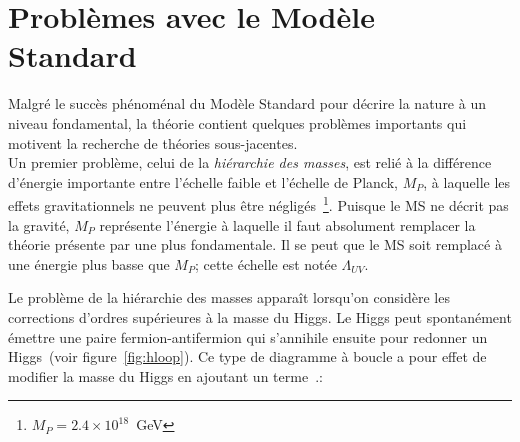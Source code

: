 



\section{Problèmes avec le Modèle Standard}
\label{sec:ms:problemes}

Malgré le succès phénoménal du Modèle Standard pour décrire la nature
à un niveau fondamental, la théorie contient quelques problèmes
importants qui motivent la recherche de théories sous-jacentes. \\

Un premier problème, celui de la \emph{hiérarchie des masses}, est
relié à la différence d'énergie importante entre l'échelle faible et
l'échelle de Planck, $M_P$, à laquelle les effets gravitationnels ne
peuvent plus être négligés~\footnote{$M_P = 2.4 \times 10^{18}$~GeV}. Puisque le MS ne décrit pas la gravité,
$M_P$ représente l'énergie à laquelle il faut absolument remplacer la
théorie présente par une plus fondamentale. Il se peut que le MS soit
remplacé à une énergie plus basse que $M_P$; cette échelle est notée $\Lambda_{UV}$.

Le problème de la hiérarchie des masses apparaît lorsqu'on considère
les corrections d'ordres supérieures à la masse du Higgs. Le Higgs peut
spontanément émettre une paire fermion-antifermion qui s'annihile
ensuite pour redonner un Higgs~(voir figure~\ref{fig:hloop}). Ce type de diagramme à boucle a pour
effet de modifier la masse du Higgs en ajoutant un terme~\cite{martin_supersymmetry_1997}.:

